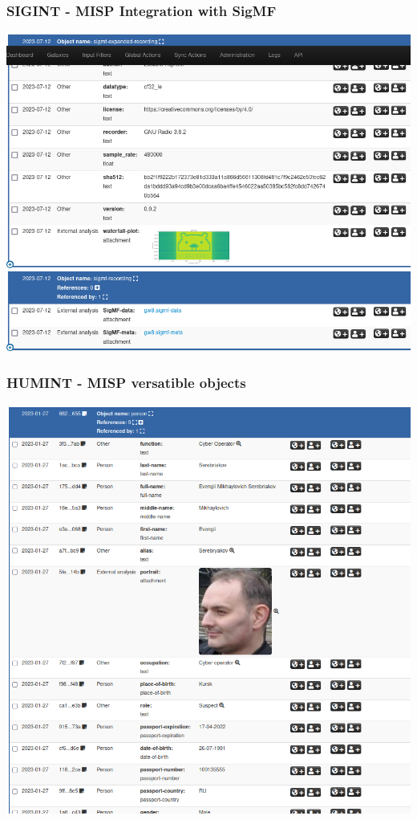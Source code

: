 \begin{frame}
    \frametitle{SIGINT - MISP Integration with SigMF}
\begin{center}
    \includegraphics[scale=0.3]{waterfall.png}
\end{center}
\end{frame}

\begin{frame}
    \frametitle{HUMINT - MISP versatible objects}
\begin{center}
    \includegraphics[scale=0.3]{gru-1.png}
\end{center}
\end{frame}

